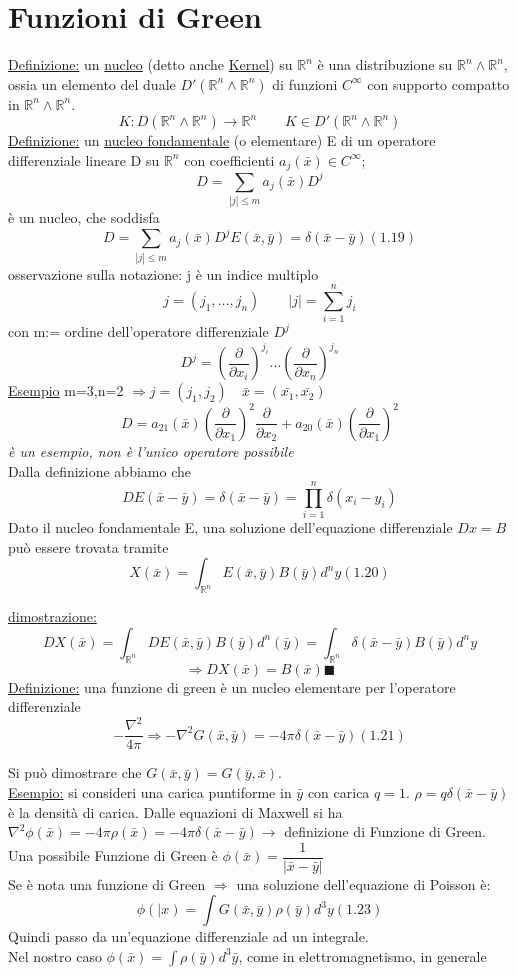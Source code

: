 \documentclass[a4paper,11pt]{report}
\newcommand{\Rn}{\mathbb{R}^n}
\newcommand{\x}{\bar{x}}
\newcommand{\y}{\bar{y}}
\begin{document}
\section{Funzioni di Green}
\underline{Definizione:} un \underline{nucleo} (detto anche \underline{Kernel}) su $\Rn$ è una distribuzione su $\Rn \wedge \Rn$, ossia un elemento del duale $D'(\Rn \wedge \Rn)$ di funzioni $C^{\infty}$ con supporto compatto in $\Rn \wedge \Rn$.
$$
K:D(\Rn \wedge \Rn)\rightarrow\Rn \qquad K\in D'(\Rn \wedge \Rn)
$$
\underline{Definizione:} un \underline{nucleo fondamentale} (o elementare) E di un operatore differenziale lineare D su $\Rn$ con coefficienti $a_j(\bar{x})\in C^{\infty}$;
$$
D=\sum_{|j|\leq m}a_j(\bar{x})D^j
$$
è un nucleo, che soddisfa
\begin{equation}
D=\sum_{|j|\leq m}a_j(\bar{x})D^jE(\bar{x},\bar{y})=\delta(\bar{x}-\bar{y}) (1.19)
\end{equation}
osservazione sulla notazione: j è un indice multiplo
$$
j=(j_1,\dots ,j_n) \qquad |j|=\sum_{i=1}^n j_i
$$
con m:= ordine dell'operatore differenziale $D^j$
$$
D^j=\left(\dfrac{\partial}{\partial x_i}\right)^{j_i}\dots \left(\dfrac{\partial}{\partial x_n}\right)^{j_n}
$$
\underline{Esempio} m=3,n=2 $\Rightarrow j=(j_1,j_2) \quad \bar{x}=(\bar{x_1},\bar{x_2})$
$$
D=a_{21}(\bar{x})\left(\dfrac{\partial}{\partial x_1}\right)^2\dfrac{\partial}{\partial x_2}+a_{20}(\bar{x})\left(\dfrac{\partial}{\partial x_1}\right)^2
$$
\emph{è un esempio, non è l'unico operatore possibile}\\
Dalla definizione abbiamo che 
$$
D E(\x-\y)=\delta(\x  - \y)=\prod_{i=1}^{n}\delta(x_i-y_i)
$$
Dato il nucleo fondamentale E, una soluzione dell'equazione differenziale $Dx=B$ può essere trovata tramite
\begin{equation}
X(\x)=\int_{\Rn}E(\x,\y)B(\y)d^ny (1.20)
\end{equation}

\underline{dimostrazione:}\\
$$
DX(\x)=\int_{\Rn}DE(\x,\y)B(\y)d^n(\y)=\int_{\Rn}\delta(\x-\y)B(\y)d^ny
$$
$$
\Rightarrow DX(\x)=B(\x) \blacksquare
$$
\underline{Definizione:} una funzione di green è un nucleo elementare per l'operatore differenziale
\begin{equation}
-\dfrac{\nabla^2}{4\pi}\Rightarrow-\nabla^2G(\x,\y)=-4\pi\delta(\x-\y) (1.21)
\end{equation}

Si può dimostrare che $G(\x,\y)=G(\y,\x)$.\\
\underline{Esempio:} si consideri una carica puntiforme in $\y$ con carica $q=1$. $\rho=q\delta(\x-\y)$ è la densità di carica. Dalle equazioni di Maxwell si ha $\nabla^2\phi(\x)=-4\pi\rho(\x)=-4\pi\delta(\x-\y)\rightarrow$ definizione di Funzione di Green.\\
Una possibile Funzione di Green è $\phi(\x)=\dfrac{1}{|\x-\y|}$\\
Se è nota una funzione di Green $\Rightarrow$ una soluzione dell'equazione di Poisson è:
$$
\phi(|x)=\int G(\x,\y)\rho(\y)d^3y (1.23)
$$
Quindi passo da un'equazione differenziale ad un integrale.\\
Nel nostro caso $\phi(\x)=\int \rho(\y)d^3\y$, come in elettromagnetismo, in generale
\end{document}
